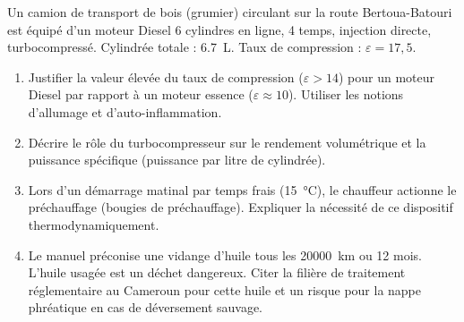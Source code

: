 \documentclass[11pt]{article}
\begin{document}
\begin{exercice}
Un camion de transport de bois (grumier) circulant sur la route Bertoua-Batouri est équipé d'un moteur Diesel 6 cylindres en ligne, 4 temps, injection directe, turbocompressé. Cylindrée totale : \SI{6,7}{\liter}. Taux de compression : $\varepsilon = 17,5$.

\begin{enumerate}
    \item Justifier la valeur élevée du taux de compression ($\varepsilon > 14$) pour un moteur Diesel par rapport à un moteur essence ($\varepsilon \approx 10$). Utiliser les notions d'allumage et d'auto-inflammation.
    \item Décrire le rôle du turbocompresseur sur le rendement volumétrique et la puissance spécifique (puissance par litre de cylindrée).
    \item Lors d'un démarrage matinal par temps frais (\SI{15}{\celsius}), le chauffeur actionne le préchauffage (bougies de préchauffage). Expliquer la nécessité de ce dispositif thermodynamiquement.
    \item Le manuel préconise une vidange d'huile tous les \SI{20000}{\kilo\meter} ou 12 mois. L'huile usagée est un déchet dangereux. Citer la filière de traitement réglementaire au Cameroun pour cette huile et un risque pour la nappe phréatique en cas de déversement sauvage.
\end{enumerate}
\end{exercice}
\end{document}
